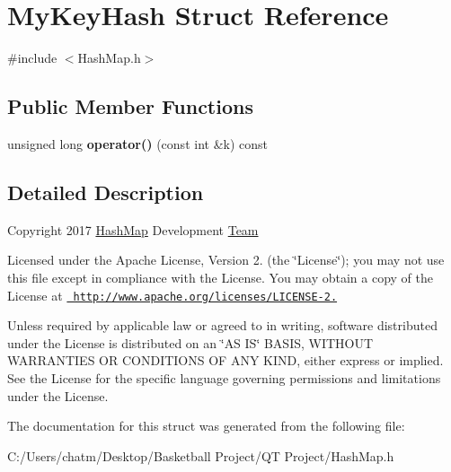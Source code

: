 \hypertarget{struct_my_key_hash}{}\section{My\+Key\+Hash Struct Reference}
\label{struct_my_key_hash}


{\ttfamily \#include $<$Hash\+Map.\+h$>$}

\subsection*{Public Member Functions}
\begin{DoxyCompactItemize}
\item 
\mbox{\label{struct_my_key_hash_abba8cc09d5c7bc0602eeb3b4f156cac8}} 
unsigned long {\bfseries operator()} (const int \&k) const
\end{DoxyCompactItemize}


\subsection{Detailed Description}
Copyright 2017 \mbox{\hyperlink{class_hash_map}{Hash\+Map}} Development \mbox{\hyperlink{class_team}{Team}}

Licensed under the Apache License, Version 2. (the \char`\"{}\+License\char`\"{}); you may not use this file except in compliance with the License. You may obtain a copy of the License at \href{http://www.apache.org/licenses/LICENSE-2.0}{\texttt{ http\+://www.\+apache.\+org/licenses/\+L\+I\+C\+E\+N\+S\+E-\/2.}}

Unless required by applicable law or agreed to in writing, software distributed under the License is distributed on an \char`\"{}\+A\+S I\+S\char`\"{} B\+A\+S\+IS, W\+I\+T\+H\+O\+UT W\+A\+R\+R\+A\+N\+T\+I\+ES OR C\+O\+N\+D\+I\+T\+I\+O\+NS OF A\+NY K\+I\+ND, either express or implied. See the License for the specific language governing permissions and limitations under the License. 

The documentation for this struct was generated from the following file\+:\begin{DoxyCompactItemize}
\item 
C\+:/\+Users/chatm/\+Desktop/\+Basketball Project/\+Q\+T Project/Hash\+Map.\+h\end{DoxyCompactItemize}
